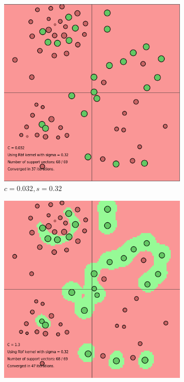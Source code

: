 \documentclass{article}
\begin{document}
\begin{figure}
\begin{subfigure}{0.3\textwidth}
   \includegraphics[width=\linewidth]{c=0032_s=032}
   \caption{$c=0.032, s=0.32$} \label{fig:x_a}
\end{subfigure}
\hspace*{\fill}
\begin{subfigure}{0.3\textwidth}
   \includegraphics[width=\linewidth]{c=13_s=032}

\end{subfigure}
\end{figure}
\end{document}
